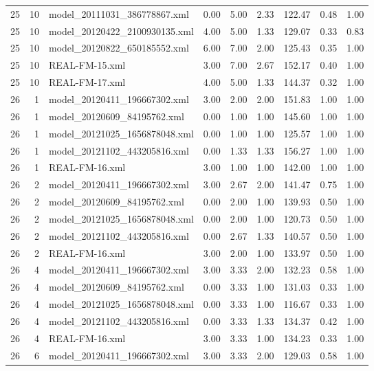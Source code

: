 \begin{table}[ht]
\begin{tabular}{rrlrrrrrr}
   25 &  10 & model\_20111031\_386778867.xml & 0.00 & 5.00 & 2.33 & 122.47 & 0.48 & 1.00 \\ 
   25 &  10 & model\_20120422\_2100930135.xml & 4.00 & 5.00 & 1.33 & 129.07 & 0.33 & 0.83 \\ 
   25 &  10 & model\_20120822\_650185552.xml & 6.00 & 7.00 & 2.00 & 125.43 & 0.35 & 1.00 \\ 
   25 &  10 & REAL-FM-15.xml & 3.00 & 7.00 & 2.67 & 152.17 & 0.40 & 1.00 \\ 
   25 &  10 & REAL-FM-17.xml & 4.00 & 5.00 & 1.33 & 144.37 & 0.32 & 1.00 \\ 
   26 &   1 & model\_20120411\_196667302.xml & 3.00 & 2.00 & 2.00 & 151.83 & 1.00 & 1.00 \\ 
   26 &   1 & model\_20120609\_84195762.xml & 0.00 & 1.00 & 1.00 & 145.60 & 1.00 & 1.00 \\ 
   26 &   1 & model\_20121025\_1656878048.xml & 0.00 & 1.00 & 1.00 & 125.57 & 1.00 & 1.00 \\ 
   26 &   1 & model\_20121102\_443205816.xml & 0.00 & 1.33 & 1.33 & 156.27 & 1.00 & 1.00 \\ 
   26 &   1 & REAL-FM-16.xml & 3.00 & 1.00 & 1.00 & 142.00 & 1.00 & 1.00 \\ 
   26 &   2 & model\_20120411\_196667302.xml & 3.00 & 2.67 & 2.00 & 141.47 & 0.75 & 1.00 \\ 
   26 &   2 & model\_20120609\_84195762.xml & 0.00 & 2.00 & 1.00 & 139.93 & 0.50 & 1.00 \\ 
   26 &   2 & model\_20121025\_1656878048.xml & 0.00 & 2.00 & 1.00 & 120.73 & 0.50 & 1.00 \\ 
   26 &   2 & model\_20121102\_443205816.xml & 0.00 & 2.67 & 1.33 & 140.57 & 0.50 & 1.00 \\ 
   26 &   2 & REAL-FM-16.xml & 3.00 & 2.00 & 1.00 & 133.97 & 0.50 & 1.00 \\ 
   26 &   4 & model\_20120411\_196667302.xml & 3.00 & 3.33 & 2.00 & 132.23 & 0.58 & 1.00 \\ 
   26 &   4 & model\_20120609\_84195762.xml & 0.00 & 3.33 & 1.00 & 131.03 & 0.33 & 1.00 \\ 
   26 &   4 & model\_20121025\_1656878048.xml & 0.00 & 3.33 & 1.00 & 116.67 & 0.33 & 1.00 \\ 
   26 &   4 & model\_20121102\_443205816.xml & 0.00 & 3.33 & 1.33 & 134.37 & 0.42 & 1.00 \\ 
   26 &   4 & REAL-FM-16.xml & 3.00 & 3.33 & 1.00 & 134.23 & 0.33 & 1.00 \\ 
   26 &   6 & model\_20120411\_196667302.xml & 3.00 & 3.33 & 2.00 & 129.03 & 0.58 & 1.00 \\ 

\end{tabular}
\end{table}

